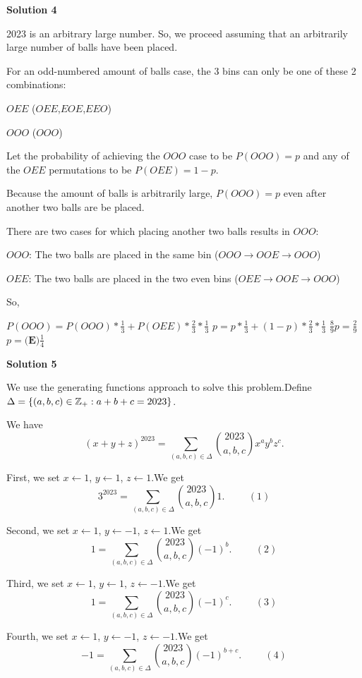 \begin{enumerate}
\textbf{Solution 4}

2023 is an arbitrary large number. So, we proceed assuming that an arbitrarily large number of balls have been placed.

 For an odd-numbered amount of balls case, the 3 bins can only be one of these 2 combinations:

 $OEE$ ($OEE$,$EOE$,$EEO$)

 $OOO$ ($OOO$)

 Let the probability of achieving the $OOO$ case to be $P(OOO) = p$ and any of the $OEE$ permutations to be $P(OEE) = 1-p$.

 Because the amount of balls is arbitrarily large, $P(OOO) = p$ even after another two balls are be placed.

 There are two cases for which placing another two balls results in $OOO$:

 $OOO$: The two balls are placed in the same bin ($OOO\to OOE\to OOO$)

 $OEE$: The two balls are placed in the two even bins ($OEE\to OOE \to OOO$)

 So, 

 $P(OOO) = P(OOO) * \frac{1}{3} + P(OEE) * \frac{2}{3} * \frac{1}{3}$
$p = p * \frac{1}{3} + (1-p) * \frac{2}{3} * \frac{1}{3}$
$\frac{8}{9}p = \frac{2}{9}$
$p = \boxed {\textbf {(E)} \frac {1}{4}}$




\textbf{Solution 5}

We use the generating functions approach to solve this problem.Define $\Delta = \left\{ \left( a, b, c \right) \in \Bbb Z_+: a+b+c = 2023 \right\}$.

 We have
 \[ \left( x + y + z \right)^{2023} = \sum_{(a,b,c) \in \Delta} \binom{2023}{a,b,c} x^a y^b z^c . \]

 First, we set $x \leftarrow 1$, $y \leftarrow 1$, $z \leftarrow 1$.We get
 \[ 3^{2023} = \sum_{(a,b,c) \in \Delta} \binom{2023}{a,b,c} 1 . \hspace{1cm} (1) \]

 Second, we set $x \leftarrow 1$, $y \leftarrow -1$, $z \leftarrow 1$.We get
 \[ 1 = \sum_{(a,b,c) \in \Delta} \binom{2023}{a,b,c} (-1)^b . \hspace{1cm} (2) \]

 Third, we set $x \leftarrow 1$, $y \leftarrow 1$, $z \leftarrow -1$.We get
 \[ 1 = \sum_{(a,b,c) \in \Delta} \binom{2023}{a,b,c} (-1)^c . \hspace{1cm} (3) \]

 Fourth, we set $x \leftarrow 1$, $y \leftarrow -1$, $z \leftarrow -1$.We get
 \[ -1 = \sum_{(a,b,c) \in \Delta} \binom{2023}{a,b,c} (-1)^{b+c} . \hspace{1cm} (4) \]


\end{enumerate}
